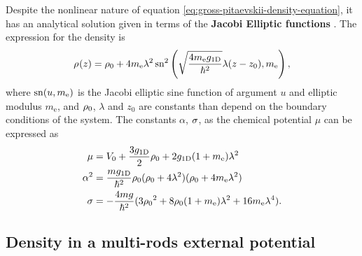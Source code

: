 Despite the nonlinear nature of equation
\eqref{eq:gross-pitaevskii-density-equation}, it has an analytical solution
given in terms of the \textbf{Jacobi Elliptic functions}
\cite{bib:abramowitz-stegun-1965}. The expression for the density is
%
\begin{equation}
  \label{eq:gross-pitaevskii-density}
  \gprho(z) = \gprho[0] + 4 \ellipm \lambda^2 \, \jacobisn^2 \left( \sqrt{\frac{4 m_{\mathrm{e}} \gonedim}{\hbar^2}} \lambda (z - z_0), m_{\mathrm{e}}\right),
\end{equation}
%
where $\jacobisn(u, m_{\mathrm{e}})$ is the Jacobi elliptic sine function of
argument $u$ and elliptic modulus $m_{\mathrm{e}}$, and $\gprho[0]$, $\lambda$
and $z_0$ are constants than depend on the boundary conditions of the system.
The constants $\alpha$, $\gpgamma$, as the chemical potential $\mu$ can be
expressed as
%
\begin{align}
  \mu      & = V_0 + \frac{3 \gonedim}{2} \gprho[0] + 2 \gonedim (1 + \ellipm) \lambda^2                            \\
  \alpha^2 & = \frac{m \gonedim}{\hbar^2} \gprho[0] (\gprho[0] + 4 \lambda^2) (\gprho[0] + 4 \ellipm \lambda^2)     \\
  \gpgamma & = -\frac{4mg}{\hbar^2} (3 \gprho[0]^2 + 8 \gprho[0] (1 + \ellipm) \lambda^2 + 16 \ellipm[] \lambda^4).
\end{align}



\subsection{Density in a multi-rods external potential}

